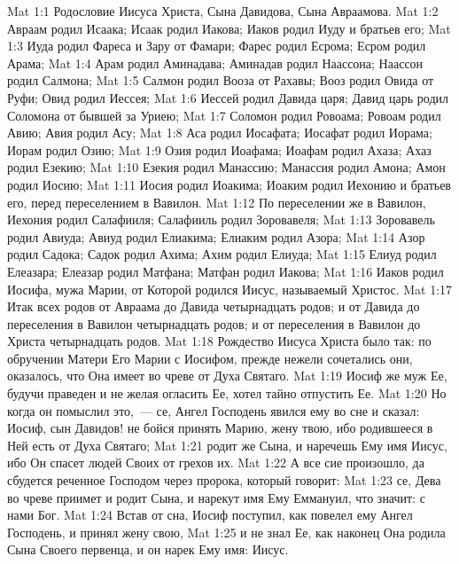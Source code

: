 \vs Mat 1:1 Родословие Иисуса Христа, Сына Давидова, Сына Авраамова.
\rsbpar\vs Mat 1:2 Авраам родил Исаака; Исаак родил Иакова; Иаков родил Иуду и братьев его;
\vs Mat 1:3 Иуда родил Фареса и Зару от Фамари; Фарес родил Есрома; Есром родил Арама;
\vs Mat 1:4 Арам родил Аминадава; Аминадав родил Наассона; Наассон родил Салмона;
\vs Mat 1:5 Салмон родил Вооза от Рахавы; Вооз родил Овида от Руфи; Овид родил Иессея;
\vs Mat 1:6 Иессей родил Давида царя; Давид царь родил Соломона от бывшей за Уриею;
\vs Mat 1:7 Соломон родил Ровоама; Ровоам родил Авию; Авия родил Асу;
\vs Mat 1:8 Аса родил Иосафата; Иосафат родил Иорама; Иорам родил Озию;
\vs Mat 1:9 Озия родил Иоафама; Иоафам родил Ахаза; Ахаз родил Езекию;
\vs Mat 1:10 Езекия родил Манассию; Манассия родил Амона; Амон родил Иосию;
\vs Mat 1:11 Иосия родил Иоакима; Иоаким родил Иехонию и братьев его, перед переселением в Вавилон.
\vs Mat 1:12 По переселении же в Вавилон, Иехония родил Салафииля; Салафииль родил Зоровавеля;
\vs Mat 1:13 Зоровавель родил Авиуда; Авиуд родил Елиакима; Елиаким родил Азора;
\vs Mat 1:14 Азор родил Садока; Садок родил Ахима; Ахим родил Елиуда;
\vs Mat 1:15 Елиуд родил Елеазара; Елеазар родил Матфана; Матфан родил Иакова;
\vs Mat 1:16 Иаков родил Иосифа, мужа Марии, от Которой родился Иисус, называемый Христос.
\vs Mat 1:17 Итак всех родов от Авраама до Давида четырнадцать родов; и от Давида до переселения в Вавилон четырнадцать родов; и от переселения в Вавилон до Христа четырнадцать родов.
\rsbpar\vs Mat 1:18 Рождество Иисуса Христа было так: по обручении Матери Его Марии с Иосифом, прежде нежели сочетались они, оказалось, что Она имеет во чреве от Духа Святаго.
\vs Mat 1:19 Иосиф же муж Ее, будучи праведен и не желая огласить Ее, хотел тайно отпустить Ее.
\vs Mat 1:20 Но когда он помыслил это,~--- се, Ангел Господень явился ему во сне и сказал: Иосиф, сын Давидов! не бойся принять Марию, жену твою, ибо родившееся в Ней есть от Духа Святаго;
\vs Mat 1:21 родит же Сына, и наречешь Ему имя Иисус, ибо Он спасет людей Своих от грехов их.
\vs Mat 1:22 А все сие произошло, да сбудется реченное Господом через пророка, который говорит:
\vs Mat 1:23 се, Дева во чреве приимет и родит Сына, и нарекут имя Ему Еммануил, что значит: с нами Бог.
\vs Mat 1:24 Встав от сна, Иосиф поступил, как повелел ему Ангел Господень, и принял жену свою,
\vs Mat 1:25 и не знал Ее, как наконец Она родила Сына Своего первенца, и он нарек Ему имя: Иисус.
